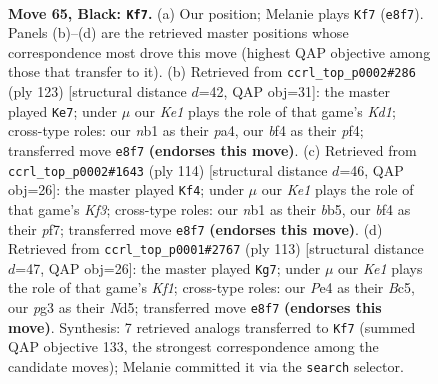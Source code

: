 \documentclass[11pt]{article}
\begin{document}
\clearpage

\begin{figure}[p]\centering
\begin{subfigure}{0.46\textwidth}\centering
\resizebox{\linewidth}{!}{%
\newchessgame
\chessboard[
  setfen={4k2K/n1P5/p7/P4p1p/4pBb1/6P1/8/RN1r4 b - - 37 65},
  showmover=false,
  pgfstyle=straightmove, color=movearrow, markmove={e8-f7}
]}
\caption{}
\end{subfigure}\hfill
\begin{subfigure}{0.46\textwidth}\centering
\resizebox{\linewidth}{!}{%
\newchessgame
\chessboard[
  setfen={3k4/8/2p4p/r2b3P/P3pP2/4K3/8/R2B4 b - - 2 62},
  showmover=false,
  pgfstyle=straightmove, color=movearrow, markmove={d8-e7}
]}
\caption{}
\end{subfigure}
\\[4pt]
\begin{subfigure}{0.46\textwidth}\centering
\resizebox{\linewidth}{!}{%
\newchessgame
\chessboard[
  setfen={1r6/5ppk/p3p3/1b2P1PP/3B4/2P2K2/8/1R6 w - - 45 58},
  showmover=false,
  pgfstyle=straightmove, color=movearrow, markmove={f3-f4}
]}
\caption{}
\end{subfigure}\hfill
\begin{subfigure}{0.46\textwidth}\centering
\resizebox{\linewidth}{!}{%
\newchessgame
\chessboard[
  setfen={5k2/5p2/1r2p2p/1Nbn4/5P1P/6PK/4B3/1R6 b - - 20 57},
  showmover=false,
  pgfstyle=straightmove, color=movearrow, markmove={f8-g7}
]}
\caption{}
\end{subfigure}
\caption{\textbf{Move 65, Black: \texttt{Kf7}.} (a) Our position; Melanie plays \texttt{Kf7} (\texttt{e8f7}). Panels (b)--(d) are the retrieved master positions whose correspondence most drove this move (highest QAP objective among those that transfer to it). (b) Retrieved from \texttt{ccrl\_top\_p0002\#286} (ply 123) [structural distance $d$=42, QAP obj=31]: the master played \texttt{Ke7}; under $\mu$ our \emph{Ke1} plays the role of that game's \emph{Kd1}; cross-type roles: our \emph{n}b1 as their \emph{p}a4, our \emph{b}f4 as their \emph{p}f4; transferred move \texttt{e8f7} \textbf{(endorses this move)}. (c) Retrieved from \texttt{ccrl\_top\_p0002\#1643} (ply 114) [structural distance $d$=46, QAP obj=26]: the master played \texttt{Kf4}; under $\mu$ our \emph{Ke1} plays the role of that game's \emph{Kf3}; cross-type roles: our \emph{n}b1 as their \emph{b}b5, our \emph{b}f4 as their \emph{p}f7; transferred move \texttt{e8f7} \textbf{(endorses this move)}. (d) Retrieved from \texttt{ccrl\_top\_p0001\#2767} (ply 113) [structural distance $d$=47, QAP obj=26]: the master played \texttt{Kg7}; under $\mu$ our \emph{Ke1} plays the role of that game's \emph{Kf1}; cross-type roles: our \emph{P}e4 as their \emph{B}c5, our \emph{p}g3 as their \emph{N}d5; transferred move \texttt{e8f7} \textbf{(endorses this move)}. Synthesis: 7 retrieved analogs transferred to \texttt{Kf7} (summed QAP objective 133, the strongest correspondence among the candidate moves); Melanie committed it via the \texttt{search} selector.}
\label{fig:thought-m129}
\end{figure}
\end{document}
